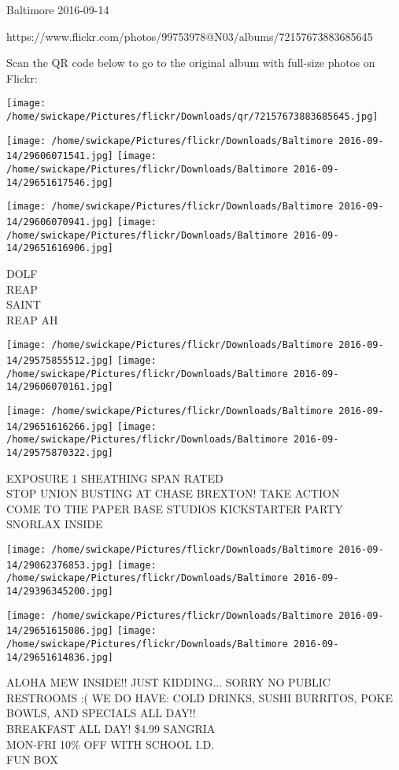 \documentclass[10pt,letterpaper]{article}
\begin{document}
Baltimore 2016-09-14

https://www.flickr.com/photos/99753978@N03/albums/72157673883685645

Scan the QR code below to go to the original album with full-size photos on Flickr:

\texttt{[image: /home/swickape/Pictures/flickr/Downloads/qr/72157673883685645.jpg]}
\pagebreak

\texttt{[image: /home/swickape/Pictures/flickr/Downloads/Baltimore 2016-09-14/29606071541.jpg]}
\texttt{[image: /home/swickape/Pictures/flickr/Downloads/Baltimore 2016-09-14/29651617546.jpg]}

\texttt{[image: /home/swickape/Pictures/flickr/Downloads/Baltimore 2016-09-14/29606070941.jpg]}
\texttt{[image: /home/swickape/Pictures/flickr/Downloads/Baltimore 2016-09-14/29651616906.jpg]}

DOLF\\
REAP\\
SAINT\\
REAP AH
\pagebreak

\texttt{[image: /home/swickape/Pictures/flickr/Downloads/Baltimore 2016-09-14/29575855512.jpg]}
\texttt{[image: /home/swickape/Pictures/flickr/Downloads/Baltimore 2016-09-14/29606070161.jpg]}

\texttt{[image: /home/swickape/Pictures/flickr/Downloads/Baltimore 2016-09-14/29651616266.jpg]}
\texttt{[image: /home/swickape/Pictures/flickr/Downloads/Baltimore 2016-09-14/29575870322.jpg]}

EXPOSURE 1 SHEATHING SPAN RATED\\
STOP UNION BUSTING AT CHASE BREXTON!   TAKE ACTION\\
COME TO THE PAPER BASE STUDIOS KICKSTARTER PARTY\\
SNORLAX INSIDE
\pagebreak

\texttt{[image: /home/swickape/Pictures/flickr/Downloads/Baltimore 2016-09-14/29062376853.jpg]}
\texttt{[image: /home/swickape/Pictures/flickr/Downloads/Baltimore 2016-09-14/29396345200.jpg]}

\texttt{[image: /home/swickape/Pictures/flickr/Downloads/Baltimore 2016-09-14/29651615086.jpg]}
\texttt{[image: /home/swickape/Pictures/flickr/Downloads/Baltimore 2016-09-14/29651614836.jpg]}

ALOHA MEW INSIDE!! JUST KIDDING...  SORRY NO PUBLIC RESTROOMS :( WE DO HAVE: COLD DRINKS, SUSHI BURRITOS, POKE BOWLS, AND SPECIALS ALL DAY!!\\
BREAKFAST ALL DAY!  \$4.99 SANGRIA\\
MON{-}FRI 10\% OFF WITH SCHOOL I.D.\\
FUN BOX
\pagebreak
\end{document}
